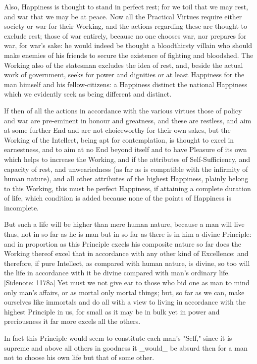 Also, Happiness is thought to stand in perfect rest; for we toil that we
may rest, and war that we may be at peace. Now all the Practical Virtues
require either society or war for their Working, and the actions
regarding these are thought to exclude rest; those of war entirely,
because no one chooses war, nor prepares for war, for war's sake: he
would indeed be thought a bloodthirsty villain who should make enemies
of his friends to secure the existence of fighting and bloodshed. The
Working also of the statesman excludes the idea of rest, and, beside the
actual work of government, seeks for power and dignities or at least
Happiness for the man himself and his fellow-citizens: a Happiness
distinct the national Happiness which we evidently seek as being
different and distinct.

If then of all the actions in accordance with the various virtues those
of policy and war are pre-eminent in honour and greatness, and these are
restless, and aim at some further End and are not choiceworthy for
their own sakes, but the Working of the Intellect, being apt for
contemplation, is thought to excel in earnestness, and to aim at no End
beyond itself and to have Pleasure of its own which helps to increase
the Working, and if the attributes of Self-Sufficiency, and capacity of
rest, and unweariedness (as far as is compatible with the infirmity
of human nature), and all other attributes of the highest Happiness,
plainly belong to this Working, this must be perfect Happiness, if
attaining a complete duration of life, which condition is added because
none of the points of Happiness is incomplete.

But such a life will be higher than mere human nature, because a man
will live thus, not in so far as he is man but in so far as there is in
him a divine Principle: and in proportion as this Principle excels
his composite nature so far does the Working thereof excel that in
accordance with any other kind of Excellence: and therefore, if pure
Intellect, as compared with human nature, is divine, so too will the
life in accordance with it be divine compared with man's ordinary life.
[Sidenote: 1178a] Yet must we not give ear to those who bid one as man
to mind only man's affairs, or as mortal only mortal things; but, so far
as we can, make ourselves like immortals and do all with a view to
living in accordance with the highest Principle in us, for small as it
may be in bulk yet in power and preciousness it far more excels all the
others.

In fact this Principle would seem to constitute each man's "Self," since
it is supreme and above all others in goodness it _would_ be absurd then
for a man not to choose his own life but that of some other.

